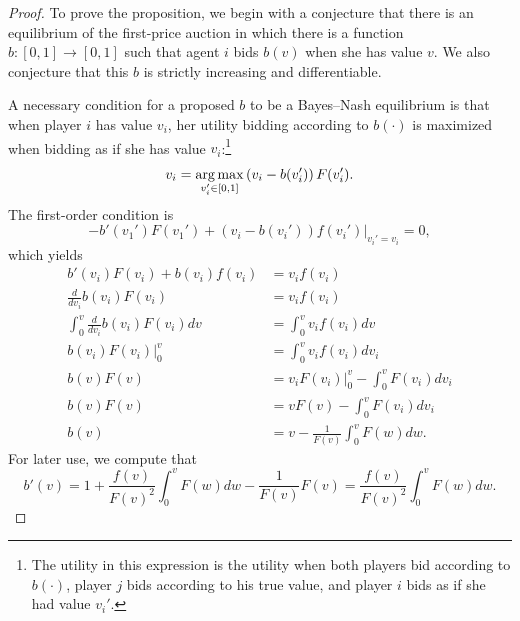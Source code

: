 \begin{proof}
	To prove the proposition, we begin with a conjecture that there is an equilibrium of the first-price auction in which there is a function $b: [0,1] \to [0,1]$ such that agent $i$ bids $b(v)$ when she has value $v$. We also conjecture that this $b$ is strictly increasing and differentiable.

	A necessary condition for a proposed $b$ to be a Bayes--Nash equilibrium is that when player $i$ has value $v_i$, her utility bidding according to $b(\cdot)$ is maximized when bidding as if she has value $v_i$:\footnote{The utility in this expression is the utility when both players bid according to $b(\cdot)$, player $j$ bids according to his true value, and player $i$ bids as if she had value $v_i'$.} \[
		v_i = \operatorname*{arg\,max}_{v_i' \in [0,1]} \left( v_i - b(v_i') \right)F(v_i')
	.\]
	The first-order condition is \[
		-b'(v_1') F(v_1') + \left.\left( v_i - b(v_i') \right)f(v_i')\right|_{v_i' = v_i} = 0
		,\] which yields 
	\begin{align*}
		b'(v_i) F(v_i) + b(v_i) f(v_i) &= v_i f(v_i) \\
		\frac{d}{dv_i} b(v_i) F(v_i) &= v_i f(v_i) \\
		\int_{0}^{v}  \frac{d}{dv_i} b(v_i) F(v_i) dv &= \int_{0}^{v}  v_i f(v_i) dv \\
		\left. b(v_i) F(v_i) \right|_{0}^{v} &= \int_{0}^{v} v_i f(v_i) dv_i \\
			b(v)F(v) &= \left. v_i F(v_i)\right|_{0}^{v} - \int_{0}^{v} F(v_i) dv_i \\
				b(v)F(v) &= vF(v) - \int_{0}^{v} F(v_i) dv_i \\
				b(v) &= v - \frac{1}{F(v)}\int_{0}^{v} F(w)dw 
	.\end{align*}
	For later use, we compute that \[
		b'(v) = 1 + \frac{f(v)}{F(v)^2} \int_{0}^{v} F(w)dw - \frac{1}{F(v)}F(v) = \frac{f(v)}{F\left( v \right)^2} \int_{0}^{v} F(w)dw  
	.\] 


\end{proof}
